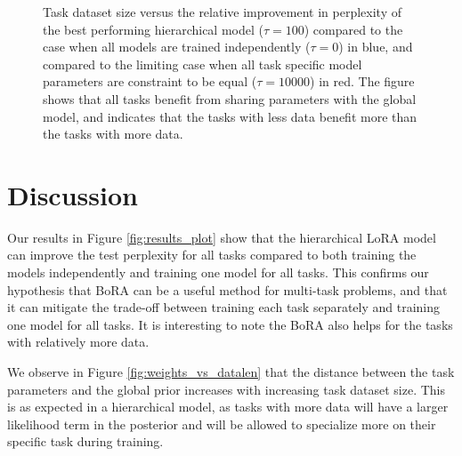 \documentclass[fullpaper]{nldl}
\begin{document}
\begin{figure}[ht]
    \centering
    \caption{Task dataset size versus the relative improvement in perplexity of the best performing hierarchical model ($\tau = 100$) compared to the case when all models are trained independently ($\tau = 0$) in blue, and compared to the limiting case when all task specific model parameters are constraint to be equal ($\tau=10000$) in red. 
    The figure shows that all tasks benefit from sharing parameters with the global model, and indicates that the tasks with less data benefit more than the tasks with more data.}
    \label{fig:relative_improvement}
\end{figure}

\section{Discussion} \label{sec:discussion}
Our results in Figure \ref{fig:results_plot} show that the hierarchical LoRA model can improve the test perplexity for all tasks compared to both training the models independently and training one model for all tasks. This confirms our hypothesis that BoRA can be a useful method for multi-task problems, and that it can mitigate the trade-off between training each task separately and training one model for all tasks.
It is interesting to note the BoRA also helps for the tasks with relatively more data.

We observe in Figure \ref{fig:weights_vs_datalen} that the distance between the task parameters and the global prior increases with increasing task dataset size. This is as expected in a hierarchical model, as tasks with more data will have a larger likelihood term in the posterior and will be allowed to specialize more on their specific task during training.
\end{document}
